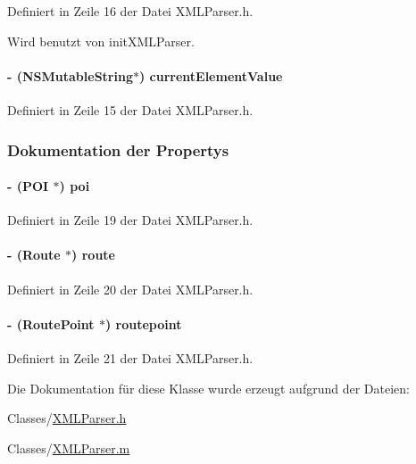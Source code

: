 Definiert in Zeile 16 der Datei XMLParser.h.

Wird benutzt von initXMLParser.\hypertarget{interface_x_m_l_parser_ae31fe02f91fbc14d7b81a19070f56415}{
\paragraph[{currentElementValue}]{\setlength{\rightskip}{0pt plus 5cm}-\/ (NSMutableString$\ast$) {\bf currentElementValue}}\hfill}
\label{interface_x_m_l_parser_ae31fe02f91fbc14d7b81a19070f56415}


Definiert in Zeile 15 der Datei XMLParser.h.

\subsubsection{Dokumentation der Propertys}
\hypertarget{interface_x_m_l_parser_ae1b4a0d3701b655822e78f0040c67bae}{
\paragraph[{poi}]{\setlength{\rightskip}{0pt plus 5cm}-\/ ({\bf POI} $\ast$) poi}\hfill}
\label{interface_x_m_l_parser_ae1b4a0d3701b655822e78f0040c67bae}


Definiert in Zeile 19 der Datei XMLParser.h.\hypertarget{interface_x_m_l_parser_a2ad7a3d5bcecc04fbcf3ff1a1094c481}{
\paragraph[{route}]{\setlength{\rightskip}{0pt plus 5cm}-\/ ({\bf Route} $\ast$) route}\hfill}
\label{interface_x_m_l_parser_a2ad7a3d5bcecc04fbcf3ff1a1094c481}


Definiert in Zeile 20 der Datei XMLParser.h.\hypertarget{interface_x_m_l_parser_addd4c6bb09826b9635e863dd6b24eb04}{
\paragraph[{routepoint}]{\setlength{\rightskip}{0pt plus 5cm}-\/ ({\bf RoutePoint} $\ast$) routepoint}\hfill}
\label{interface_x_m_l_parser_addd4c6bb09826b9635e863dd6b24eb04}


Definiert in Zeile 21 der Datei XMLParser.h.

Die Dokumentation für diese Klasse wurde erzeugt aufgrund der Dateien:\begin{DoxyCompactItemize}
\item 
Classes/\hyperlink{_x_m_l_parser_8h}{XMLParser.h}\item 
Classes/\hyperlink{_x_m_l_parser_8m}{XMLParser.m}\end{DoxyCompactItemize}
